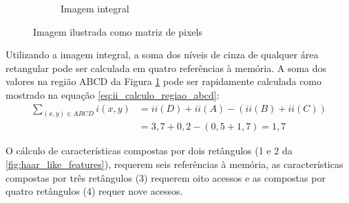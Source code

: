 \begin{figure}[htbp]
    \begin{subfigure}[c]{0.3\textwidth}
    \centering
    \caption{Imagem integral}
    \end{subfigure}%
    \caption{Imagem ilustrada como matriz de pixels}
    \label{fig:imagem_integral}
\end{figure}

Utilizando a imagem integral, a soma dos níveis de cinza de qualquer área retangular pode ser calculada em quatro referências à memória. A soma dos valores na região ABCD da Figura \ref{fig:imagem_integral} pode ser rapidamente calculada como mostrado na equação \ref{eq:ii_calculo_regiao_abcd}:
%
\begin{align} \label{eq:ii_calculo_regiao_abcd}
    \sum_{(x,y) \in ABCD} i(x,y) &= ii(D) + ii(A) - (ii(B) + ii(C))\\
                                 &= 3,7 + 0,2 - (0,5 + 1,7) = 1,7\nonumber
\end{align}

O cálculo de características compostas por dois retângulos (1 e 2 da \ref{fig:haar_like_features}), requerem seis referências à memória, as características compostas por três retângulos (3) requerem oito acessos e as compostas por quatro retângulos (4) requer nove acessos.


